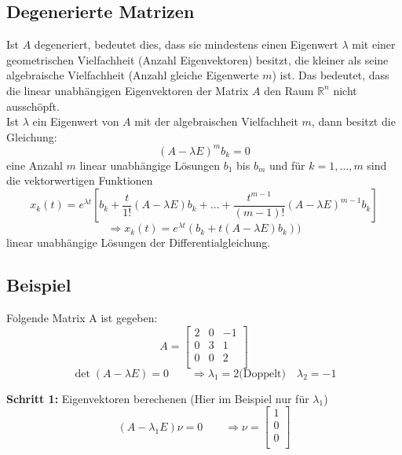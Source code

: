 \subsection{Degenerierte Matrizen}
Ist $A$ degeneriert, bedeutet dies, dass sie mindestens einen Eigenwert $\lambda$ mit einer geometrischen Vielfachheit (Anzahl Eigenvektoren) besitzt, die kleiner als seine algebraische Vielfachheit (Anzahl gleiche Eigenwerte $m$) ist. 
Das bedeutet, dass die linear unabhängigen Eigenvektoren der Matrix $A$ den Raum $\mathbb{R}^n$ nicht ausschöpft.\\
Ist $\lambda$ ein Eigenwert von $A$ mit der algebraischen Vielfachheit $m$, dann besitzt die Gleichung: 
\begin{equation*}
(A-\lambda E)^m b_k = 0
\end{equation*}
eine Anzahl $m$ linear unabhängige Lösungen $b_1$ bis $b_m$ und für $k = 1,\ldots,m$ sind die vektorwertigen Funktionen
\begin{equation*}
x_k(t) = e^{\lambda t}\left[{b_k + \frac{t}{1!}(A-\lambda E)b_k + ... + \frac{t^{m-1}}{(m-1)!}(A-\lambda E)^{m-1}b_k}\right]
\end{equation*}
\begin{equation*}
 \Longrightarrow x_k(t) = e^{\lambda t}(b_k + t (A-\lambda E) b_k))
\end{equation*}
linear unabhängige Lösungen der Differentialgleichung. 
\subsection{Beispiel}
Folgende Matrix A ist gegeben: 
\begin{equation*}
	A =     
\begin{bmatrix} %
	2 & 0 & -1\\
	0 & 3 & 1\\
	0 & 0 & 2\\
\end{bmatrix}
\end{equation*}
\begin{equation*}
\det(A-\lambda E) = 0 \qquad \Longrightarrow \lambda_1 = 2 \text{(Doppelt)} \quad \lambda_2 = -1
\end{equation*}

\textbf{Schritt 1:} Eigenvektoren berechenen (Hier im Beispiel nur für $\lambda_1$)\\
\begin{equation*}
(A - \lambda_1 E)\nu = 0 \qquad \Longrightarrow \nu = 
\begin{bmatrix} %
	1 \\
	0 \\
	0 \\
\end{bmatrix}
\end{equation*}


